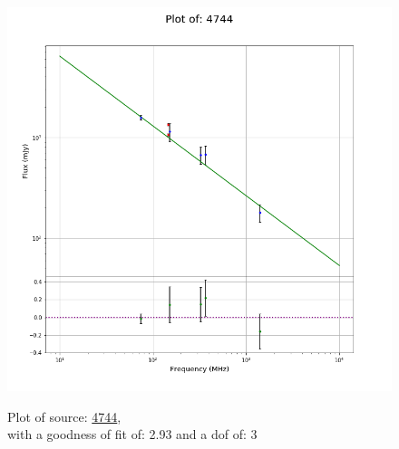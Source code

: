 \documentclass{article}
\begin{document}
\begin{figure}[H]
\begin{minipage}{0.5\textwidth}
        \includegraphics[scale = 0.35]{KmeulenSimSource_1hr/1hr4744.png}
        \captionsetup{labelformat=empty}
        \caption{Plot of source: \href{http://banana.transientskp.org/r4/vlo_KmeulenSimSource/runningcatalog/4744}{4744},\\with a goodness of fit of: 2.93 and a dof of: 3}
    \addtocounter{figure}{-1}
    \label{KmeulenSimSource:1hr:4744:plot}
    \end{minipage}
\end{figure}
\end{document}
